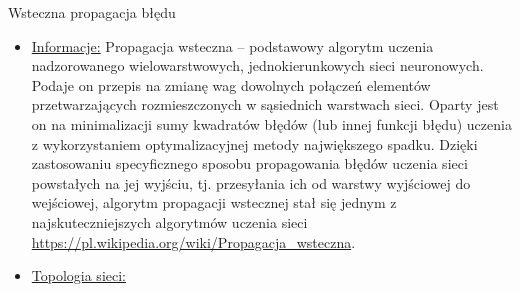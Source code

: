 \documentclass[10pt, a4paper]{article}
\def\layersep{2.5cm}
\begin{document}
\begin{center}
{\LARGE Wsteczna propagacja błędu}

\begin{itemize}


\item[]
\underline{Informacje:}
Propagacja wsteczna – podstawowy algorytm uczenia nadzorowanego wielowarstwowych, jednokierunkowych sieci neuronowych. Podaje on przepis na zmianę wag dowolnych połączeń elementów przetwarzających rozmieszczonych w sąsiednich warstwach sieci. Oparty jest on na minimalizacji sumy kwadratów błędów (lub innej funkcji błędu) uczenia z wykorzystaniem optymalizacyjnej metody największego spadku. Dzięki zastosowaniu specyficznego sposobu propagowania błędów uczenia sieci powstałych na jej wyjściu, tj. przesyłania ich od warstwy wyjściowej do wejściowej, algorytm propagacji wstecznej stał się jednym z najskuteczniejszych algorytmów uczenia sieci
\url{https://pl.wikipedia.org/wiki/Propagacja_wsteczna}.

\item[]
\underline{Topologia sieci:}
\def\layersep{2.5cm}

\end{itemize}
\end{center}
\end{document}
